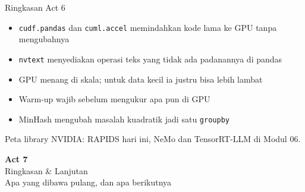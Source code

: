 \documentclass[aspectratio=169,t]{beamer}
\newcommand{\acttitle}[3]{%
  \begin{frame}[plain]
    \vspace{1.5cm}
    \begin{center}
      {\color{nvgreen}\Huge\bfseries Act #1}\\[1.2em]
      {\color{nvwhite}\Huge #2}\\[0.8em]
      {\color{nvgray}\Large #3}
    \end{center}
  \end{frame}%
}
\begin{document}
\begin{frame}{Ringkasan Act 6}
  \begin{itemize}
    \item[\textcolor{nvgreen}{\checkmark}] \texttt{cudf.pandas} dan \texttt{cuml.accel} memindahkan kode lama ke GPU tanpa mengubahnya
    \item[\textcolor{nvgreen}{\checkmark}] \texttt{nvtext} menyediakan operasi teks yang tidak ada padanannya di pandas
    \item[\textcolor{nvgreen}{\checkmark}] GPU menang di skala; untuk data kecil ia justru bisa lebih lambat
    \item[\textcolor{nvgreen}{\checkmark}] Warm-up wajib sebelum mengukur apa pun di GPU
    \item[\textcolor{nvgreen}{\checkmark}] MinHash mengubah masalah kuadratik jadi satu \texttt{groupby}
  \end{itemize}
  \vspace{0.9em}
  \begin{center}
    {\color{nvlightgreen}\small Peta library NVIDIA: RAPIDS hari ini, NeMo dan TensorRT-LLM di Modul 06.}
  \end{center}
\end{frame}

\acttitle{7}{Ringkasan \& Lanjutan}{Apa yang dibawa pulang, dan apa berikutnya}
\end{document}
